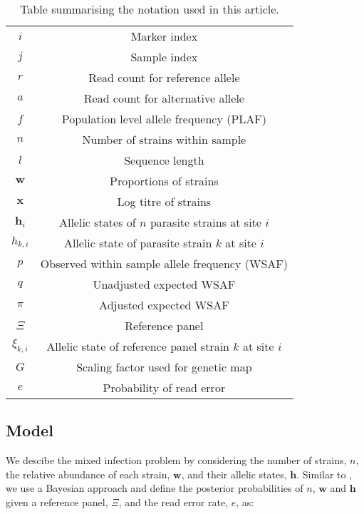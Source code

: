 \documentclass{bioinfo}
\begin{document}
\begin{table}[htb]\centering
\begin{tabular}{c|c}\hline
$i$              & Marker index\\
$j$              & Sample index \\
$r$              & Read count for reference allele \\
$a$              & Read count for alternative allele \\
$f$              & Population level allele frequency (PLAF) \\
$n$              & Number of strains within sample \\
$l$              & Sequence length \\
$\mathbf{w}$      & Proportions of strains \\
$\mathbf{x}$	& Log titre of strains \\
$\mathbf{h}_{i}$ & Allelic states of $n$ parasite strains at site $i$ \\
$h_{k,i}$   & Allelic state of parasite strain $k$ at site $i$\\
$p$              & Observed within sample allele frequency (WSAF) \\
$q$              & Unadjusted expected WSAF  \\
$\pi$            & Adjusted expected WSAF \\
$\Xi$            & Reference panel\\
$\xi_{k,i}$     & Allelic state of reference panel strain $k$ at site $i$\\
$G$              & Scaling factor used for genetic map\\
$e$              & Probability of read error\\ \hline
\end{tabular}
\caption{Table summarising the notation used in this article.}\label{tab:notation}
\end{table}


\subsection{Model}

We descibe the mixed infection problem by considering the number of strains, $n$, the relative abundance of each strain, $\mathbf{w}$, and their allelic states, $\mathbf{h}$. Similar to \citet{Jack2016}, we use a Bayesian approach and define the posterior probabilities of $n$, $\mathbf{w}$ and $\mathbf{h}$ given a reference panel, $\Xi$, and the read error rate, $e$, as:
\end{document}
